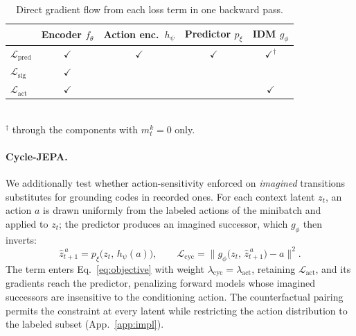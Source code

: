 \documentclass{article}
\begin{document}
\begin{table}[t]
  \centering
  \small
  \caption{Direct gradient flow from each loss term in one backward pass.}
  \label{tab:gradflow}
  \begin{tabular}{lcccc}
    \toprule
    & Encoder $f_\theta$ & Action enc.\ $h_\psi$ & Predictor $p_\xi$ & IDM $g_\phi$ \\
    \midrule
    $\mathcal{L}_{\mathrm{pred}}$ & $\checkmark$ & $\checkmark$ & $\checkmark$ & $\checkmark^{\dagger}$ \\
    $\mathcal{L}_{\mathrm{sig}}$  & $\checkmark$ &              &              & \\
    $\mathcal{L}_{\mathrm{act}}$  & $\checkmark$ &              &              & $\checkmark$ \\
    \bottomrule
  \end{tabular}
  \\[2pt]
  {\footnotesize $^{\dagger}$ through the components with $m_t^{k} = 0$ only.}
\end{table}

\paragraph{Cycle-JEPA.}
We additionally test whether action-sensitivity enforced on \emph{imagined}
transitions substitutes for grounding codes in recorded ones. For each context
latent $z_t$, an action $a$ is drawn uniformly from the labeled actions of the
minibatch and applied to $z_t$; the predictor produces an imagined successor, which
$g_\phi$ then inverts:
\begin{equation}
  \hat z^{\,a}_{t+1} = p_\xi\bigl(z_t,\, h_\psi(a)\bigr),
  \qquad
  \mathcal{L}_{\mathrm{cyc}}
    = \bigl\lVert g_\phi\bigl(z_t,\, \hat z^{\,a}_{t+1}\bigr) - a \bigr\rVert^{2}.
  \label{eq:cycle}
\end{equation}
The term enters Eq.~\ref{eq:objective} with weight
$\lambda_{\mathrm{cyc}} = \lambda_{\mathrm{act}}$, retaining
$\mathcal{L}_{\mathrm{act}}$, and its gradients reach the predictor, penalizing
forward models whose imagined successors are insensitive to the conditioning
action. The counterfactual pairing permits the constraint at every latent while
restricting the action distribution to the labeled subset (App.~\ref{app:impl}).
\end{document}
